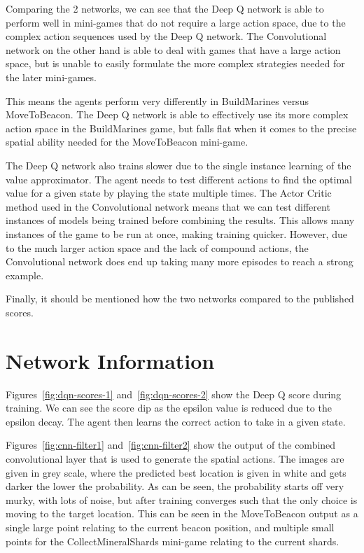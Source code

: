 Comparing the 2 networks, we can see that the Deep Q network is able to perform
well in mini-games that do not require a large action space, due to the complex
action sequences used by the Deep Q network. The Convolutional network on the
other hand is able to deal with games that have a large action space, but is
unable to easily formulate the more complex strategies needed for the later
mini-games.

This means the agents perform very differently in BuildMarines versus MoveToBeacon.
The Deep Q network is able to effectively use its more complex action space in
the BuildMarines game, but falls flat when it comes to the precise spatial
ability needed for the MoveToBeacon mini-game.

The Deep Q network also trains slower due to the single instance learning of the
value approximator. The agent needs to test different actions to find the
optimal value for a given state by playing the state multiple times. The Actor
Critic method used in the Convolutional network means that we can test different
instances of models being trained before combining the results. This allows many
instances of the game to be run at once, making training quicker. However, due
to the much larger action space and the lack of compound actions, the
Convolutional network does end up taking many more episodes to reach a strong
example.

Finally, it should be mentioned how the two networks compared to the published
scores. %

\section{Network Information}

Figures~\ref{fig:dqn-scores-1} and~\ref{fig:dqn-scores-2} show the Deep Q score
during training. We can see the score dip as the epsilon value is reduced due to
the epsilon decay. The agent then learns the correct action to take in a given
state.

Figures~\ref{fig:cnn-filter1} and~\ref{fig:cnn-filter2} show the output of the
combined convolutional layer that is used to generate the spatial actions. The
images are given in grey scale, where the predicted best location is given in
white and gets darker the lower the probability. As can be seen, the
probability starts off very murky, with lots of noise, but after training
converges such that the only choice is moving to the target location. This can
be seen in the MoveToBeacon output as a single large point relating to the
current beacon position, and multiple small points for the CollectMineralShards
mini-game relating to the current shards.

